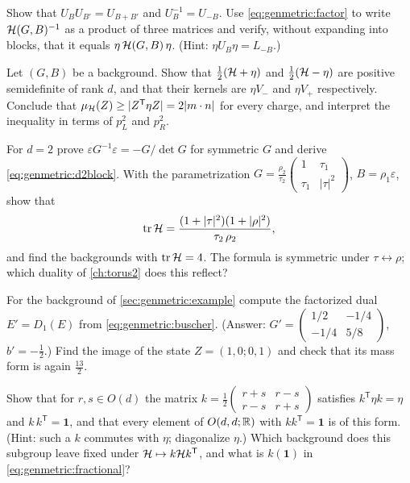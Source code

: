 \begin{exercise}[$\star$]\label{ex:genmetric:inverse}
Show that $U_BU_{B'}=U_{B+B'}$ and $U_B^{-1}=U_{-B}$. Use \eqref{eq:genmetric:factor} to write
$\mathcal{H}(G,B)^{-1}$ as a product of three matrices and verify, without expanding into blocks,
that it equals $\eta\,\mathcal{H}(G,B)\,\eta$. (Hint: $\eta U_B\eta=L_{-B}$.)
\end{exercise}

\begin{exercise}[$\star\star$]\label{ex:genmetric:projectors}
Let $(G,B)$ be a background. Show that $\frac12(\mathcal{H}+\eta)$ and $\frac12(\mathcal{H}-\eta)$ are
positive semidefinite of rank $d$, and that their kernels are $\eta V_-$ and $\eta V_+$
respectively. Conclude that $\mu_{\mathcal{H}}(Z)\ge|Z^{\mathsf T}\eta Z|=2|m\cdot n|$ for every
charge, and interpret the inequality in terms of $p_L^2$ and $p_R^2$.
\end{exercise}

\begin{exercise}[$\star\star$]\label{ex:genmetric:taurho}
For $d=2$ prove $\varepsilon G^{-1}\varepsilon=-G/\det G$ for symmetric $G$ and derive
\eqref{eq:genmetric:d2block}. With the parametrization
$G=\frac{\rho_2}{\tau_2}\left(\begin{smallmatrix}1&\tau_1\\\tau_1&|\tau|^2\end{smallmatrix}
\right)$, $B=\rho_1\varepsilon$, show that
\[
 \operatorname{tr}\mathcal{H}=\frac{(1+|\tau|^2)(1+|\rho|^2)}{\tau_2\,\rho_2},
\]
and find the backgrounds with $\operatorname{tr}\mathcal{H}=4$. The formula is symmetric under
$\tau\leftrightarrow\rho$; which duality of \cref{ch:torus2} does this reflect?
\end{exercise}

\begin{exercise}[$\star\star$]\label{ex:genmetric:buscher}
For the background of \cref{sec:genmetric:example} compute the factorized dual $E'=D_1(E)$
from \eqref{eq:genmetric:buscher}. (Answer: $G'=\left(\begin{smallmatrix}1/2&-1/4\\-1/4&5/8
\end{smallmatrix}\right)$, $b'=-\frac12$.) Find the image of the state $Z=(1,0;0,1)$ and
check that its mass form is again $\frac{13}2$.
\end{exercise}

\begin{exercise}[$\star\star$]\label{ex:genmetric:stabilizer}
Show that for $r,s\in O(d)$ the matrix
$k=\frac12\left(\begin{smallmatrix}r+s&r-s\\r-s&r+s\end{smallmatrix}\right)$ satisfies
$k^{\mathsf T}\eta k=\eta$ and $k\,k^{\mathsf T}=\mathbf 1$, and that every element of
$O(d,d;\mathbb{R})$ with $kk^{\mathsf T}=\mathbf 1$ is of this form. (Hint: such a $k$ commutes with
$\eta$; diagonalize $\eta$.) Which background does this subgroup leave fixed under
$\mathcal{H}\mapsto k\mathcal{H} k^{\mathsf T}$, and what is $k(\mathbf 1)$ in \eqref{eq:genmetric:fractional}?
\end{exercise}

